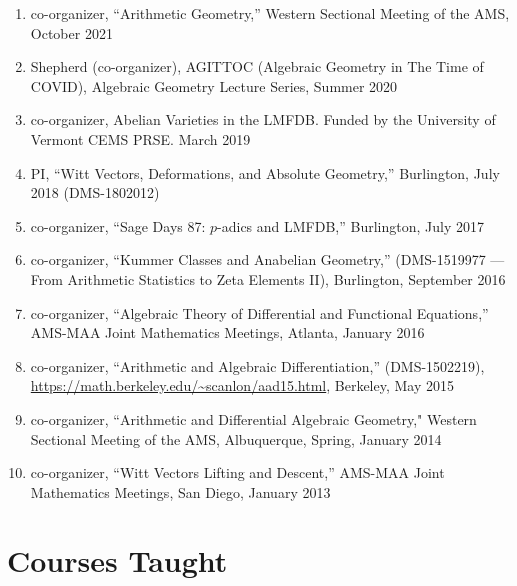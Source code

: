 \documentclass[a4paper,10pt]{article}
\begin{document}
\begin{enumerate} %
	\item co-organizer, ``Arithmetic Geometry,'' Western Sectional Meeting of the AMS, October 2021
	\item Shepherd (co-organizer), AGITTOC (Algebraic Geometry in The Time of COVID), Algebraic Geometry Lecture Series, Summer 2020  
	\item co-organizer, Abelian Varieties in the LMFDB. Funded by the University of Vermont CEMS PRSE. March 2019
	\item PI, ``Witt Vectors, Deformations, and Absolute Geometry,'' Burlington, July 2018 (DMS-1802012)
	\item co-organizer, ``Sage Days 87: $p$-adics and LMFDB,'' Burlington, July 2017
	\item co-organizer, ``Kummer Classes and Anabelian Geometry,'' (DMS-1519977 --- From Arithmetic Statistics to Zeta Elements II), Burlington, September 2016
	\item co-organizer, ``Algebraic Theory of Differential and Functional Equations,''  AMS-MAA Joint Mathematics Meetings, Atlanta, January 2016
	\item co-organizer, ``Arithmetic and Algebraic Differentiation,'' (DMS-1502219), \url{https://math.berkeley.edu/~scanlon/aad15.html}, Berkeley, May 2015 
	\item co-organizer, ``Arithmetic and Differential Algebraic Geometry," Western Sectional Meeting of the AMS, Albuquerque, Spring, January 2014
	\item co-organizer, ``Witt Vectors Lifting and Descent,'' AMS-MAA Joint Mathematics Meetings, San Diego, January 2013
\end{enumerate}

\section*{Courses Taught}
\end{document}
